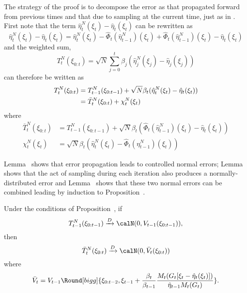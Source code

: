 The strategy of the proof is to decompose the error as that propagated forward
from previous times and that due to sampling at the current time, just as in
\cite{DelMoral:2004ux}. First note that the term
$\hat\eta_t^N(\xi_t)-\hat\eta_t(\xi_t)$ can be rewritten as
\begin{equation}
  \hat\eta_t^N(\xi_t)-\hat\eta_t(\xi_t) =
  \hat\eta_t^N(\xi_t) - \hat\Phi_t(\hat\eta_{t-1}^N)(\xi_t) +
  \hat\Phi_t(\hat\eta_{t-1}^N)(\xi_t) - \hat\eta_t(\xi_t)
\end{equation}
and the weighted sum,
\begin{equation}
  T_t^N(\xi_{0:t}) =\sqrt{N}
  \sum_{j=0}^t\beta_j(\hat\eta_j^N(\xi_j)-\hat\eta_j(\xi_j))
\end{equation}
can therefore be written as
\begin{align}
  T_t^N(\xi_{0:t}) &= T_{t-1}^N(\xi_{0:t-1}) +
  \sqrt{N}\beta_t(\hat\eta_t^N(\xi_t)-\hat\eta_t(\xi_t)) \notag\\
  &= \bar{T}_t^N(\xi_{0:t}) + \chi_t^N(\xi_t)
\end{align}
where
\begin{align}
  \bar{T}_t^N(\xi_{0:t}) &= T_{t-1}^N(\xi_{0:t-1}) +
  \sqrt{N}\beta_t(\hat\Phi_t(\hat\eta_{t-1}^N)(\xi_t) - \hat\eta_t(\xi_t))
  \label{eq:bar_t_t} \\
  \chi_t^N(\xi_t) &=
  \sqrt{N}\beta_t(\hat\eta_t^N(\xi_t) - \hat\Phi_t(\eta_{t-1}^N)(\xi_t))
\end{align}

Lemma~ shows that error propagation leads to
controlled normal errors; Lemma~ shows that the act of
sampling during each iteration also produces a normally-distributed error and
Lemma~ shows that these two normal errors can be combined
leading by induction to Proposition~.

\begin{lemma}\label{lem:propagation}
  Under the conditions of Proposition~, if
  \begin{equation*}
    T_{t-1}^N(\xi_{0:t-1})\xrightarrow{D}\calN(0,V_{t-1}(\xi_{0:t-1})),
  \end{equation*}
  then
  \begin{equation}
    \bar{T}_t^N(\xi_{0:t})\xrightarrow{D}\calN(0, \bar{V}_t(\xi_{0:t}))
  \end{equation}
  where
  \begin{equation}
    \bar{V}_t = V_{t-1}\Round[bigg]{\xi_{0:t-2}, \xi_{t-1} +
      \frac{\beta_t}{\beta_{t-1}}
      \frac{M_t(G_t[\xi_t-\hat\eta_t(\xi_t)])}{\hat\eta_{t-1}M_t(G_t)}}.
  \end{equation}
\end{lemma}

